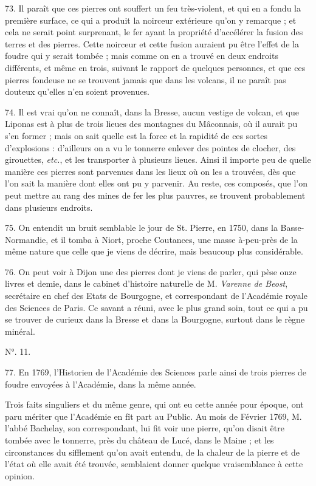 \documentclass[a4paper, 11pt, oneside, polutonikogreek, french]{article}
\begin{document}
73. Il paraît que ces pierres ont souffert un feu très-violent, et qui en a fondu la première surface, ce qui a produit la noirceur extérieure qu'on y remarque ; et cela ne serait point surprenant, le fer ayant la propriété d'accélérer la fusion des terres et des pierres. Cette noirceur et cette fusion auraient pu être l'effet de la foudre qui y serait tombée ; mais comme on en a trouvé en deux endroits différents, et même en trois, suivant le rapport de quelques personnes, et que ces pierres fondeuse ne se trouvent jamais que dans les volcans, il ne paraît pas douteux qu'elles n'en soient provenues.

74. Il est vrai qu'on ne connaît, dans la Bresse, aucun vestige de volcan, et que Liponas est à plus de trois lieues des montagnes du Mâconnais, où il aurait pu s'en former ; mais on sait quelle est la force et la rapidité de ces sortes d'explosions : d'ailleurs on a vu le tonnerre enlever des pointes de clocher, des girouettes, \emph{etc.}, et les transporter à plusieurs lieues. Ainsi il importe peu de quelle manière ces pierres sont parvenues dans les lieux où on les a trouvées, dès que l'on sait la manière dont elles ont pu y parvenir. Au reste, ces composés, que l'on peut mettre au rang des mines de fer les plus pauvres, se trouvent probablement dans plusieurs endroits.

75. On entendit un bruit semblable le jour de St. Pierre, en 1750, dans la Basse-Normandie, et il tomba à Niort, proche Coutances, une masse à-peu-près de la même nature que celle que je viens de décrire, mais beaucoup plus considérable.

76. On peut voir à Dijon une des pierres dont je viens de parler, qui pèse onze livres et demie, dans le cabinet d'histoire naturelle de M. \emph{Varenne de Beost}, secrétaire en chef des Etats de Bourgogne, et correspondant de l'Académie royale des Sciences de Paris. Ce savant a réuni, avec le plus grand soin, tout ce qui a pu se trouver de curieux dans la Bresse et dans la Bourgogne, surtout dans le règne minéral.

\begin{center}
N°. 11.
\end{center}

77. En 1769, l'Historien de l'Académie des Sciences parle ainsi de trois pierres de foudre envoyées à l'Académie, dans la même année.

\og Trois faits singuliers et du même genre, qui ont eu cette année pour époque, ont paru mériter que l'Académie en fît part au Public. Au mois de Février 1769, M. l'abbé Bachelay, son correspondant, lui fit voir une pierre, qu'on disait être tombée avec le tonnerre, près du château de Lucé, dans le Maine ; et les circonstances du sifflement qu'on avait entendu, de la chaleur de la pierre et de l'état où elle avait été trouvée, semblaient donner quelque vraisemblance à cette opinion. \fg
\end{document}
